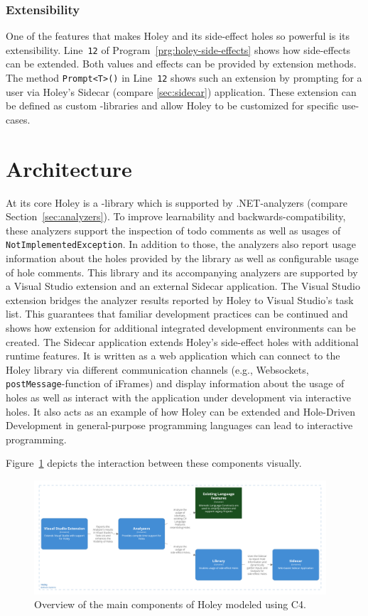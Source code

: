 \subsubsection{Extensibility}
One of the features that makes Holey and its side-effect holes so powerful is its extensibility.
Line~\verb|12| of Program~\ref{prg:holey-side-effects} shows how side-effects can be extended.
Both values and effects can be provided by extension methods.
The method \verb|Prompt<T>()| in Line~\verb|12| shows such an extension by prompting for a user via Holey's Sidecar (compare \ref{sec:sidecar}) application.
These extension can be defined as custom \CS-libraries and allow Holey to be customized for specific use-cases.


\section{Architecture}
\label{sec:holey-architecture}
At its core Holey is a \CS-library which is supported by .NET-analyzers (compare Section~\ref{sec:analyzers}).
To improve learnability and backwards-compatibility, these analyzers support the inspection of todo comments as well as usages of \verb|NotImplementedException|.
In addition to those, the analyzers also report usage information about the holes provided by the library as well as configurable usage of hole comments.
This library and its accompanying analyzers are supported by a Visual Studio extension and an external Sidecar application.
The Visual Studio extension bridges the analyzer results reported by Holey to Visual Studio's task list.
This guarantees that familiar development practices can be continued and shows how extension for additional integrated development environments can be created.
The Sidecar application extends Holey's side-effect holes with additional runtime features.
It is written as a web application which can connect to the Holey library via different communication channels (e.g., Websockets, \verb|postMessage|-function of iFrames) and display information about the usage of holes as well as interact with the application under development via interactive holes.
It also acts as an example of how Holey can be extended and Hole-Driven Development in general-purpose programming languages can lead to interactive programming.

Figure~\ref{fig:holey-architecture} depicts the interaction between these components visually.
\begin{figure}[ht]
    \centering
    \includegraphics[width=0.97\textwidth]{images/holey-architecture}
    \caption{Overview of the main components of Holey modeled using C4.}
    \label{fig:holey-architecture}
\end{figure}

